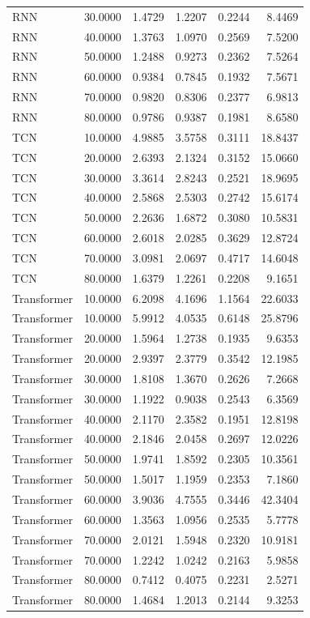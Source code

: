 \begin{tabular}{lrrrrr}
RNN & 30.0000 & 1.4729 & 1.2207 & 0.2244 & 8.4469 \\
RNN & 40.0000 & 1.3763 & 1.0970 & 0.2569 & 7.5200 \\
RNN & 50.0000 & 1.2488 & 0.9273 & 0.2362 & 7.5264 \\
RNN & 60.0000 & 0.9384 & 0.7845 & 0.1932 & 7.5671 \\
RNN & 70.0000 & 0.9820 & 0.8306 & 0.2377 & 6.9813 \\
RNN & 80.0000 & 0.9786 & 0.9387 & 0.1981 & 8.6580 \\
TCN & 10.0000 & 4.9885 & 3.5758 & 0.3111 & 18.8437 \\
TCN & 20.0000 & 2.6393 & 2.1324 & 0.3152 & 15.0660 \\
TCN & 30.0000 & 3.3614 & 2.8243 & 0.2521 & 18.9695 \\
TCN & 40.0000 & 2.5868 & 2.5303 & 0.2742 & 15.6174 \\
TCN & 50.0000 & 2.2636 & 1.6872 & 0.3080 & 10.5831 \\
TCN & 60.0000 & 2.6018 & 2.0285 & 0.3629 & 12.8724 \\
TCN & 70.0000 & 3.0981 & 2.0697 & 0.4717 & 14.6048 \\
TCN & 80.0000 & 1.6379 & 1.2261 & 0.2208 & 9.1651 \\
Transformer & 10.0000 & 6.2098 & 4.1696 & 1.1564 & 22.6033 \\
Transformer & 10.0000 & 5.9912 & 4.0535 & 0.6148 & 25.8796 \\
Transformer & 20.0000 & 1.5964 & 1.2738 & 0.1935 & 9.6353 \\
Transformer & 20.0000 & 2.9397 & 2.3779 & 0.3542 & 12.1985 \\
Transformer & 30.0000 & 1.8108 & 1.3670 & 0.2626 & 7.2668 \\
Transformer & 30.0000 & 1.1922 & 0.9038 & 0.2543 & 6.3569 \\
Transformer & 40.0000 & 2.1170 & 2.3582 & 0.1951 & 12.8198 \\
Transformer & 40.0000 & 2.1846 & 2.0458 & 0.2697 & 12.0226 \\
Transformer & 50.0000 & 1.9741 & 1.8592 & 0.2305 & 10.3561 \\
Transformer & 50.0000 & 1.5017 & 1.1959 & 0.2353 & 7.1860 \\
Transformer & 60.0000 & 3.9036 & 4.7555 & 0.3446 & 42.3404 \\
Transformer & 60.0000 & 1.3563 & 1.0956 & 0.2535 & 5.7778 \\
Transformer & 70.0000 & 2.0121 & 1.5948 & 0.2320 & 10.9181 \\
Transformer & 70.0000 & 1.2242 & 1.0242 & 0.2163 & 5.9858 \\
Transformer & 80.0000 & 0.7412 & 0.4075 & 0.2231 & 2.5271 \\
Transformer & 80.0000 & 1.4684 & 1.2013 & 0.2144 & 9.3253 \\
\bottomrule
\end{tabular}
